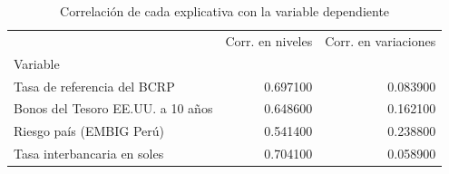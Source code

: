 \begin{table}
\caption{Correlación de cada explicativa con la variable dependiente}
\label{tab:corr_Y}
\begin{tabular}{lrr}
\toprule
 & Corr. en niveles & Corr. en variaciones \\
Variable &  &  \\
\midrule
Tasa de referencia del BCRP & 0.697100 & 0.083900 \\
Bonos del Tesoro EE.UU. a 10 años & 0.648600 & 0.162100 \\
Riesgo país (EMBIG Perú) & 0.541400 & 0.238800 \\
Tasa interbancaria en soles & 0.704100 & 0.058900 \\
\bottomrule
\end{tabular}
\end{table}
